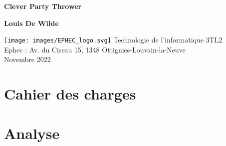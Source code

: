 \documentclass[12pt]{article}
\begin{document}
    \begin{titlepage}
        \begin{center}
            \vspace*{1cm}

            \Huge
            \textbf{Clever Party Thrower}

            \vspace{0.5cm}

            \vspace{1.5cm}

            \textbf{Louis De Wilde}

            \vfill

            \texttt{[image: images/EPHEC\_logo.svg]}
            \vfill
            \vspace{0.8cm}
            \Large
            Technologie de l'informatique 3TL2 \\
            Ephec : Av. du Ciseau 15, 1348 Ottignies-Louvain-la-Neuve\\
            Novembre 2022

        \end{center}
    \end{titlepage}
    \thispagestyle{empty}
    \newpage
    \setcounter{page}{0}

    \section{Cahier des charges}\label{sec:cahier-des-charges}
    
    \newpage

    \section{Analyse}\label{sec:analyse}
    
    \newpage
\end{document}
